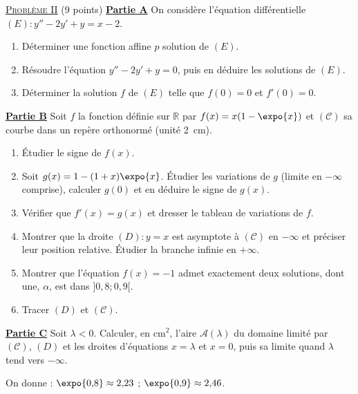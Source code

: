 \noindent \underline{\textsc{Probl\`eme II}} (9 points) \newline
\underline{\textbf{Partie A}} \newline
On consid\`ere l'\'equation diff\'erentielle $(E) : y'' - 2y' + y = x - 2$.
\begin{enumerate}
      \item D\'eterminer une fonction affine $p$ solution de $(E)$.
      \item R\'esoudre l'\'equation $y'' - 2y' + y = 0$, puis en d\'eduire les solutions de $(E)$.
      \item D\'eterminer la solution $f$ de $(E)$ telle que $f(0) = 0$ et $f'(0) = 0$.
\end{enumerate}
\underline{\textbf{Partie B}} \newline
Soit $f$ la fonction d\'efinie sur $\mathbb{R}$ par $f(x) = x(1 - \expo{x})$ et $(\mathscr{C})$ sa courbe dans un rep\`ere orthonorm\'e (unit\'e 2~cm).
\begin{enumerate}
      \item \'Etudier le signe de $f(x)$.
      \item Soit $g(x) = 1 - (1 + x)\expo{x}$. \'Etudier les variations de $g$ (limite en $-\infty$ comprise), calculer $g(0)$ et en d\'eduire
            le signe de $g(x)$.
      \item V\'erifier que $f'(x) = g(x)$ et dresser le tableau de variations de $f$.
      \item Montrer que la droite $(D) : y = x$ est asymptote \`a $(\mathscr{C})$ en $-\infty$ et pr\'eciser leur position relative.
            \'Etudier la branche infinie en $+\infty$.
      \item Montrer que l'\'equation $f(x) = -1$ admet exactement deux solutions, dont une, $\alpha$, est dans $]0{,}8 ; 0{,}9[$.
      \item Tracer $(D)$ et $(\mathscr{C})$.
\end{enumerate}
\underline{\textbf{Partie C}} \newline
Soit $\lambda < 0$. Calculer, en cm$^2$, l'aire $\mathscr{A}(\lambda)$ du domaine limit\'e par $(\mathscr{C})$, $(D)$ et les droites d'\'equations
$x = \lambda$ et $x = 0$, puis sa limite quand $\lambda$ tend vers $-\infty$.
\begin{center}
On donne : $\expo{0{,}8} \approx 2{,}23$ ; $\expo{0{,}9} \approx 2{,}46$.
\end{center}

\newpage

